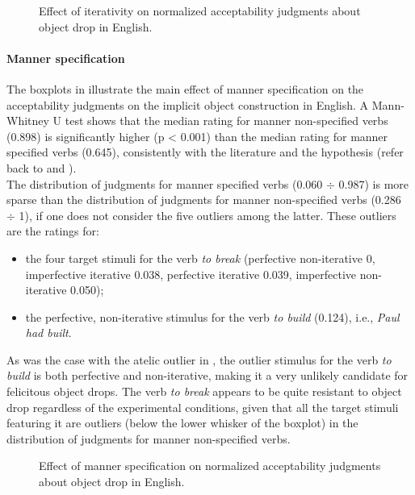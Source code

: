 \begin{figure}[htb]
\caption{Effect of iterativity on normalized acceptability judgments about object drop in English.}
    
\end{figure}

\paragraph{Manner specification}
The boxplots in  illustrate the main effect of manner specification on the acceptability judgments on the implicit object construction in English. A Mann-Whitney U test shows that the median rating for manner non-specified verbs (0.898) is significantly higher (p < 0.001) than the median rating for manner specified verbs (0.645), consistently with the literature and the hypothesis (refer back to  and ).\\
The distribution of judgments for manner specified verbs (0.060 $\div$ 0.987) is more sparse than the distribution of judgments for manner non-specified verbs (0.286 $\div$ 1), if one does not consider the five outliers among the latter. These outliers are the ratings for:
\begin{itemize}
    \item the four target stimuli for the verb \textit{to break} (perfective non-iterative 0, imperfective iterative 0.038, perfective iterative 0.039, imperfective non-iterative 0.050);
    \item the perfective, non-iterative stimulus for the verb \textit{to build} (0.124), i.e., \textit{Paul had built}.
\end{itemize}
As was the case with the atelic outlier in , the outlier stimulus for the verb \textit{to build} is both perfective and non-iterative, making it a very unlikely candidate for felicitous object drops. The verb \textit{to break} appears to be quite resistant to object drop regardless of the experimental conditions, given that all the target stimuli featuring it are outliers (below the lower whisker of the boxplot) in the distribution of judgments for manner non-specified verbs.

\begin{figure}[htb]
\caption{Effect of manner specification on normalized acceptability judgments about object drop in English.}
    
\end{figure}


